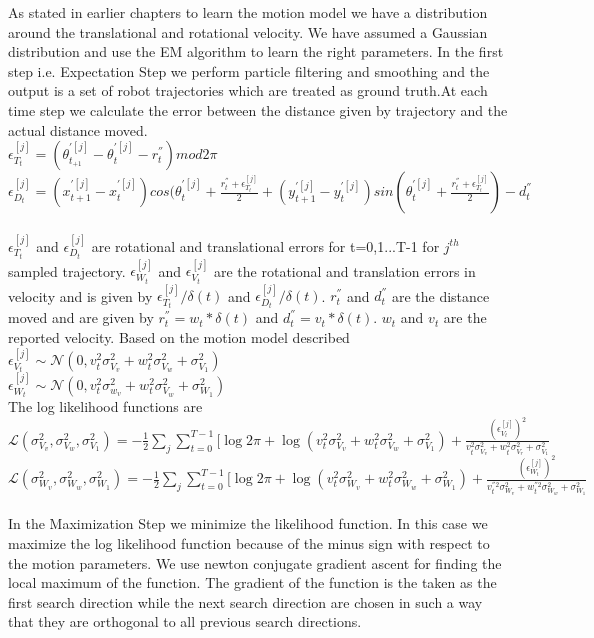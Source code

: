 \documentclass[12pt]{dalcsthesis}
\begin{document}
{As stated in earlier chapters to learn the motion model we have a distribution around the translational and rotational velocity. We have assumed a Gaussian distribution and use the EM algorithm to learn the right parameters.
In the first step i.e. Expectation Step  we perform particle filtering and smoothing and the output is a set of robot trajectories which are treated as ground truth.At each time step we calculate the error between the distance given by trajectory and the actual distance moved. 
\\
$\epsilon_{T_{t}}^{[j]}=(\theta_{t_{+1}}^{'[j]}-\theta_{t}^{'[j]}-r_{t}^{''})mod2\pi$ 
\\
$\epsilon_{D_{t}}^{[j]}=(x_{t+1}^{'[j]}-x_{t}^{'[j]})cos(\theta_{t}^{'[j]}+\frac{r_{t}^{''}+\epsilon_{T_{t}}^{[j]}}{2}+(y_{t+1}^{'[j]}-y_{t}^{'[j]})sin(\theta_{t}^{'[j]}+\frac{r_{t}^{''}+\epsilon_{T_{t}}^{[j]}}{2})-d_{t}^{''}$
\\
\\
$\epsilon_{T_{t}}^{[j]}$ and $\epsilon_{D_{t}}^{[j]}$ are rotational and translational errors for t=0,1...T-1 for $j^{th}$ sampled trajectory. $\epsilon_{W_{t}}^{[j]}$ and $\epsilon_{V_{t}}^{[j]}$ are the rotational and translation errors in velocity and is given by $\epsilon_{T_{t}}^{[j]}/\delta(t)$ and $\epsilon_{D_{t}}^{[j]}/\delta(t)$. $r_{t}^{''}$ and $d_{t}^{''}$ are the distance moved and are  given by $r_{t}^{''}=w_{t}*\delta(t)$ and $d_{t}^{''}=v_{t}*\delta(t)$. $w_{t}$ and $v_{t}$ are the reported velocity. 
Based on the motion model described 
\\
$\epsilon_{V_{t}}^{[j]}\sim\mathcal{{N}}(0,v_{t}^{2}\sigma_{V_{v}}^{2}+w_{t}^{2}\sigma_{V_{w}}^{2}+\sigma_{V_{1}}^{2})$
\\
$\epsilon_{W_{t}}^{[j]}\sim\mathcal{{N}}(0,v_{t}^{2}\sigma_{w_{v}}^{2}+w_{t}^{2}\sigma_{V_{w}}^{2}+\sigma_{W_{1}}^{2})$
\\
The log likelihood functions are
\\
$\mathcal{{L}}(\sigma_{V_{v}}^{2},\sigma_{V_{w}}^{2},\sigma_{V_{1}}^{2})=-\frac{1}{2}\sum_{j}\sum_{t=0}^{T-1}[\log2\pi+\log(v_{t}^{2}\sigma_{V_{v}}^{2}+w_{t}^{2}\sigma_{V_{w}}^{2}+\sigma_{V_{1}}^{2})+\frac{(\epsilon_{V_{t}}^{[j]})^{2}}{v_{t}^{2}\sigma_{V_{v}}^{2}+w_{t}^{2}\sigma_{V_{r}}^{2}+\sigma_{V_{1}}^{2}}$
\\
$\mathcal{{L}}(\sigma_{W_{v}}^{2},\sigma_{W_{w}}^{2},\sigma_{W_{1}}^{2})=-\frac{1}{2}\sum_{j}\sum_{t=0}^{T-1}[\log2\pi+\log(v_{t}^{2}\sigma_{W_{v}}^{2}+w_{t}^{2}\sigma_{W_{w}}^{2}+\sigma_{W_{1}}^{2})+\frac{(\epsilon_{W_{t}}^{[j]})^{2}}{v_{t}^{''2}\sigma_{W_{v}}^{2}+w_{t}^{''2}\sigma_{W_{w}}^{2}+\sigma_{W_{1}}^{2}}$
\\
\\
In the Maximization Step we minimize the likelihood function. In this
case we maximize the log likelihood function because of the minus
sign with respect to the motion parameters. We use newton conjugate
gradient ascent for finding the local maximum of the function. The
gradient of the function is the taken as the first search direction
while the next search direction are chosen in such a way that they
are orthogonal to all previous search directions.

}
\end{document}
